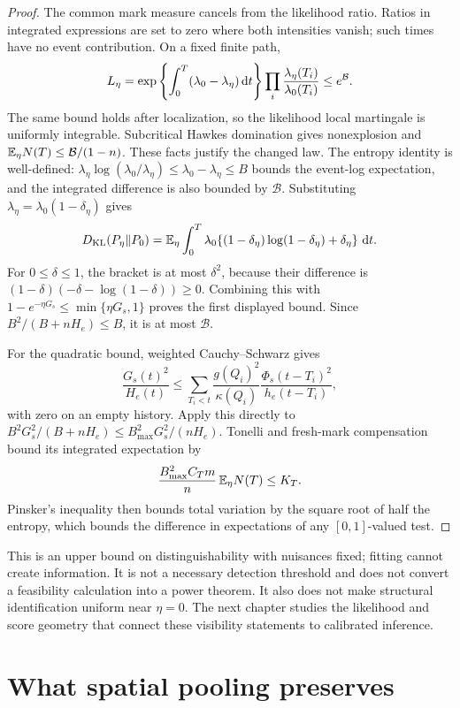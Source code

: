 \begin{proof}
The common mark measure cancels from the likelihood ratio. Ratios in integrated expressions are set to zero where both intensities vanish; such times have no event contribution. On a fixed finite path,
\[
L_\eta=\exp\left\{\int_0^T(\lambda_0-\lambda_\eta)\mathop{}\!\mathrm{d} t\right\}
\prod_i\frac{\lambda_\eta(T_i)}{\lambda_0(T_i)}
\le e^{\mathcal B}.
\]
The same bound holds after localization, so the likelihood local martingale is uniformly integrable. Subcritical Hawkes domination gives nonexplosion and \(\mathbb{E} _\eta N(T)\le\mathcal B/(1-n)\). These facts justify the changed law. The entropy identity is well-defined: \(\lambda_\eta\log(\lambda_0/\lambda_\eta)\le\lambda_0-\lambda_\eta\le B\) bounds the event-log expectation, and the integrated difference is also bounded by \(\mathcal B\). Substituting \(\lambda_\eta=\lambda_0(1-\delta_\eta)\) gives
\[
D_{\mathrm{KL}}(P_\eta\Vert P_0)=\mathbb{E} _\eta\int_0^T\lambda_0
\{(1-\delta_\eta)\log(1-\delta_\eta)+\delta_\eta\}\,\mathop{}\!\mathrm{d} t.
\]
For \(0\le\delta\le1\), the bracket is at most \(\delta^2\), because their difference is \((1-\delta)(-\delta-\log(1-\delta))\ge0\). Combining this with \(1-e^{-\eta G_s}\le\min\{\eta G_s,1\}\) proves the first displayed bound. Since \(B^2/(B+nH_e)\le B\), it is at most \(\mathcal B\).

For the quadratic bound, weighted Cauchy--Schwarz gives
\[
\frac{G_s(t)^2}{H_e(t)}\le
\sum_{T_i<t}\frac{g(Q_i)^2}{\kappa(Q_i)}
\frac{\Phi_s(t-T_i)^2}{h_e(t-T_i)},
\]
with zero on an empty history. Apply this directly to
\(B^2G_s^2/(B+nH_e)\le B_{\max}^2G_s^2/(nH_e)\).
Tonelli and fresh-mark compensation bound its integrated expectation by
\[
\frac{B_{\max}^2 C_Tm}{n}\,\mathbb{E} _\eta N(T)\le K_T.
\]
Pinsker's inequality then bounds total variation by the square root of half the entropy, which bounds the difference in expectations of any \([0,1]\)-valued test.
\end{proof}

This is an upper bound on distinguishability with nuisances fixed; fitting cannot create information. It is not a necessary detection threshold and does not convert a feasibility calculation into a power theorem. It also does not make structural identification uniform near \(\eta=0\). The next chapter studies the likelihood and score geometry that connect these visibility statements to calibrated inference.

\section{What spatial pooling preserves}
\label{sec:regional_pooling}

